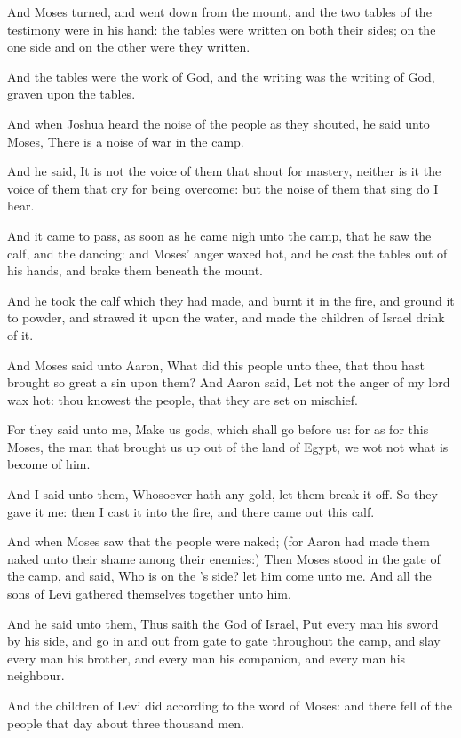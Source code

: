 \Verse And Moses turned, and went down from the mount, and the two tables of the testimony were in his hand: the tables were written on both their sides; on the one side and on the other were they written.

\Verse And the tables were the work of God, and the writing was the writing of God, graven upon the tables.

\Verse And when Joshua heard the noise of the people as they shouted, he said unto Moses, There is a noise of war in the camp.

\Verse And he said, It is not the voice of them that shout for mastery, neither is it the voice of them that cry for being overcome: but the noise of them that sing do I hear.

\Verse And it came to pass, as soon as he came nigh unto the camp, that he saw the calf, and the dancing: and Moses' anger waxed hot, and he cast the tables out of his hands, and brake them beneath the mount.

\Verse And he took the calf which they had made, and burnt it in the fire, and ground it to powder, and strawed it upon the water, and made the children of Israel drink of it.

\Verse And Moses said unto Aaron, What did this people unto thee, that thou hast brought so great a sin upon them?  \Verse And Aaron said, Let not the anger of my lord wax hot: thou knowest the people, that they are set on mischief.

\Verse For they said unto me, Make us gods, which shall go before us: for as for this Moses, the man that brought us up out of the land of Egypt, we wot not what is become of him.

\Verse And I said unto them, Whosoever hath any gold, let them break it off. So they gave it me: then I cast it into the fire, and there came out this calf.

\Verse And when Moses saw that the people were naked; (for Aaron had made them naked unto their shame among their enemies:) \Verse Then Moses stood in the gate of the camp, and said, Who is on the \LORD's side? let him come unto me. And all the sons of Levi gathered themselves together unto him.

\Verse And he said unto them, Thus saith the \LORD God of Israel, Put every man his sword by his side, and go in and out from gate to gate throughout the camp, and slay every man his brother, and every man his companion, and every man his neighbour.

\Verse And the children of Levi did according to the word of Moses: and there fell of the people that day about three thousand men.

